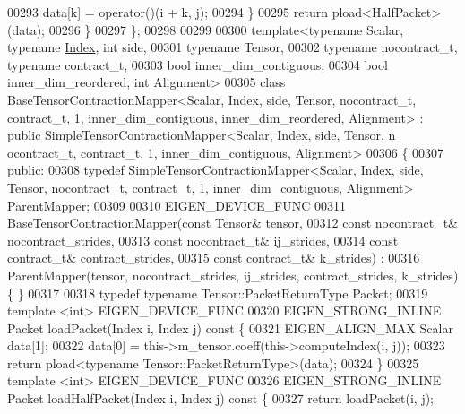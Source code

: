 \begin{DoxyCode}
00293       data[k] = operator()(i + k, j);
00294     \}
00295     \textcolor{keywordflow}{return} pload<HalfPacket>(data);
00296   \}
00297 \};
00298 
00299 
00300 \textcolor{keyword}{template}<\textcolor{keyword}{typename} Scalar, \textcolor{keyword}{typename} \hyperlink{namespace_eigen_a62e77e0933482dafde8fe197d9a2cfde}{Index}, \textcolor{keywordtype}{int} side,
00301          \textcolor{keyword}{typename} Tensor,
00302          \textcolor{keyword}{typename} nocontract\_t, \textcolor{keyword}{typename} contract\_t,
00303          \textcolor{keywordtype}{bool} inner\_dim\_contiguous,
00304          \textcolor{keywordtype}{bool} inner\_dim\_reordered, \textcolor{keywordtype}{int} Alignment>
00305 \textcolor{keyword}{class }BaseTensorContractionMapper<Scalar, Index, side, Tensor, nocontract\_t, contract\_t, 1, 
      inner\_dim\_contiguous, inner\_dim\_reordered, Alignment> : \textcolor{keyword}{public} SimpleTensorContractionMapper<Scalar, Index, side, Tensor, n
      ocontract\_t, contract\_t, 1, inner\_dim\_contiguous, Alignment>
00306 \{
00307  \textcolor{keyword}{public}:
00308   \textcolor{keyword}{typedef} SimpleTensorContractionMapper<Scalar, Index, side, Tensor, nocontract\_t, contract\_t, 1,
       inner\_dim\_contiguous, Alignment> ParentMapper;
00309 
00310   EIGEN\_DEVICE\_FUNC
00311   BaseTensorContractionMapper(\textcolor{keyword}{const} Tensor& tensor,
00312                               \textcolor{keyword}{const} nocontract\_t& nocontract\_strides,
00313                               \textcolor{keyword}{const} nocontract\_t& ij\_strides,
00314                               \textcolor{keyword}{const} contract\_t& contract\_strides,
00315                               \textcolor{keyword}{const} contract\_t& k\_strides) :
00316   ParentMapper(tensor, nocontract\_strides, ij\_strides, contract\_strides, k\_strides) \{ \}
00317 
00318   \textcolor{keyword}{typedef} \textcolor{keyword}{typename} Tensor::PacketReturnType Packet;
00319   \textcolor{keyword}{template} <\textcolor{keywordtype}{int}> EIGEN\_DEVICE\_FUNC
00320   EIGEN\_STRONG\_INLINE Packet loadPacket(Index i, Index j)\textcolor{keyword}{ const }\{
00321     EIGEN\_ALIGN\_MAX Scalar data[1];
00322     data[0] = this->m\_tensor.coeff(this->computeIndex(i, j));
00323     \textcolor{keywordflow}{return} pload<typename Tensor::PacketReturnType>(data);
00324   \}
00325   \textcolor{keyword}{template} <\textcolor{keywordtype}{int}> EIGEN\_DEVICE\_FUNC
00326   EIGEN\_STRONG\_INLINE Packet loadHalfPacket(Index i, Index j)\textcolor{keyword}{ const }\{
00327     \textcolor{keywordflow}{return} loadPacket(i, j);

\end{DoxyCode}
